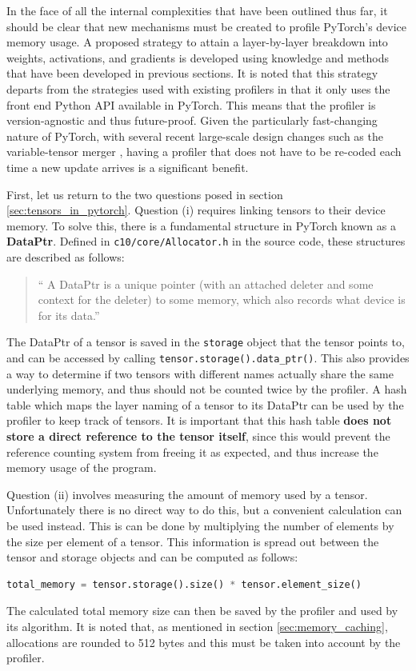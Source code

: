 \documentclass[12pt,letterpaper]{article}
\begin{document}
In the face of all the internal complexities that have been outlined thus far, it should be clear that new mechanisms must be created to profile PyTorch's device memory usage. A proposed strategy to attain a layer-by-layer breakdown into weights, activations, and gradients is developed using knowledge and methods that have been developed in previous sections. It is noted that this strategy departs from the strategies used with existing profilers in that it only uses the front end Python API available in PyTorch. This means that the profiler is version-agnostic and thus future-proof. Given the particularly fast-changing nature of PyTorch, with several recent large-scale design changes such as the variable-tensor merger \cite{pytorch_variable_tensor_merger}, having a profiler that does not have to be re-coded each time a new update arrives is a significant benefit. 
\par 

First, let us return to the two questions posed in section \ref{sec:tensors_in_pytorch}. Question (i) requires linking tensors to their device memory. To solve this, there is a fundamental structure in PyTorch known as a \textbf{DataPtr}. Defined in \texttt{c10/core/Allocator.h} in the source code, these structures are described as follows:
\begin{quote}
\enquote{
A DataPtr is a unique pointer (with an attached deleter and some context for the deleter) to some memory, which also records what device is for its data.}
\end{quote}
The DataPtr of a tensor is saved in the \texttt{storage} object that the tensor points to, and can be accessed by calling \texttt{tensor.storage().data\_ptr()}. This also provides a way to determine if two tensors with different names actually share the same underlying memory, and thus should not be counted twice by the profiler. A hash table which maps the layer naming of a tensor to its DataPtr can be used by the profiler to keep track of tensors. It is important that this hash table \textbf{does not store a direct reference to the tensor itself}, since this would prevent the reference counting system from freeing it as expected, and thus increase the memory usage of the program. 
\par 

Question (ii) involves measuring the amount of memory used by a tensor. Unfortunately there is no direct way to do this, but a convenient calculation can be used instead. This is can be done by multiplying the number of elements by the size per element of a tensor. This information is spread out between the tensor and storage objects and can be computed as follows:
\begin{lstlisting}[language=Python]
total_memory = tensor.storage().size() * tensor.element_size()
\end{lstlisting}
The calculated total memory size can then be saved by the profiler and used by its algorithm. It is noted that, as mentioned in section \ref{sec:memory_caching}, allocations are rounded to 512 bytes and this must be taken into account by the profiler.
\par 
\end{document}

